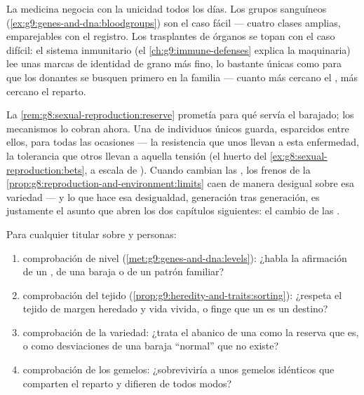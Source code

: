 \begin{example}\label{ex:g9:unique-individuals:medicine}
La medicina negocia con la unicidad todos los días. Los grupos
sanguíneos (\cref{ex:g9:genes-and-dna:bloodgroups}) son el caso fácil
--- cuatro clases amplias, emparejables con el registro. Los
trasplantes de órganos se topan con el caso difícil: el sistema
inmunitario (el \cref{ch:g9:immune-defenses} explica la maquinaria) lee
unas marcas de identidad de grano más fino, lo bastante únicas como
para que los donantes se busquen primero en la familia --- cuanto más
cercano el , más cercano el reparto.
\end{example}

\begin{proposition}\label{prop:g9:unique-individuals:reserve}
La \cref{rem:g8:sexual-reproduction:reserve} prometía para qué servía
el barajado; los mecanismos lo cobran ahora. Una  de individuos
únicos guarda, esparcidos entre ellos,  para todas las ocasiones
--- la resistencia que unos llevan a esta enfermedad, la tolerancia que
otros llevan a aquella tensión (el huerto del
\cref{ex:g8:sexual-reproduction:bets}, a escala de ). Cuando
cambian las , los frenos de la
\cref{prop:g8:reproduction-and-environment:limits} caen de manera
desigual sobre esa variedad --- y lo que hace esa desigualdad,
generación tras generación, es justamente el asunto que abren los dos
capítulos siguientes: el cambio de las .
\end{proposition}
\admitted

\begin{method}\label{met:g9:unique-individuals:claims}
Para cualquier titular sobre  y personas:
\begin{enumerate}
  \item comprobación de nivel (\cref{met:g9:genes-and-dna:levels}):
        ¿habla la afirmación de un , de una baraja o de un patrón
        familiar?
  \item comprobación del tejido
        (\cref{prop:g9:heredity-and-traits:sorting}): ¿respeta el
        tejido de margen heredado y vida vivida, o finge que un  es
        un destino?
  \item comprobación de la variedad: ¿trata el abanico de una 
        como la reserva que es, o como desviaciones de una baraja
        ``normal'' que no existe?
  \item comprobación de los gemelos: ¿sobreviviría a unos gemelos
        idénticos que comparten el reparto y difieren de todos modos?
\end{enumerate}
\end{method}

